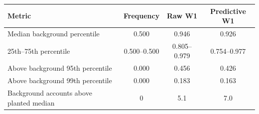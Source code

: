 \begin{tabular}{lccc}
\toprule
Metric & Frequency & Raw W1 & Predictive W1 \\
\midrule
Median background percentile & 0.500 & 0.946 & 0.926 \\
25th--75th percentile & 0.500--0.500 & 0.805--0.979 & 0.754--0.977 \\
Above background 95th percentile & 0.000 & 0.456 & 0.426 \\
Above background 99th percentile & 0.000 & 0.183 & 0.163 \\
Background accounts above planted median & 0 & 5.1 & 7.0 \\
\bottomrule
\end{tabular}
